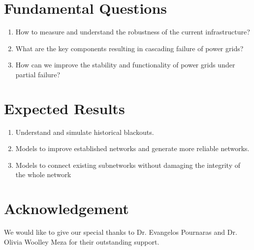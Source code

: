 \documentclass[11pt, a4paper]{article}
\begin{document}
\section{Fundamental Questions}
\begin{enumerate}
\item How to measure and understand the robustness of the current infrastructure?
\item What are the key components resulting in cascading failure of power grids?
\item How can we improve the stability and functionality of power grids under partial failure?
\end{enumerate}

\section{Expected Results}
\begin{enumerate}
\item Understand and simulate historical blackouts.
\item Models to improve established networks and generate more reliable networks.
\item Models to connect existing subnetworks without damaging the integrity of the whole network
\end{enumerate}


\nocite{*}



\section*{Acknowledgement}
We would like to give our special thanks to Dr. Evangelos Pournaras and Dr. Olivia Woolley Meza for their outstanding support.
\end{document}
